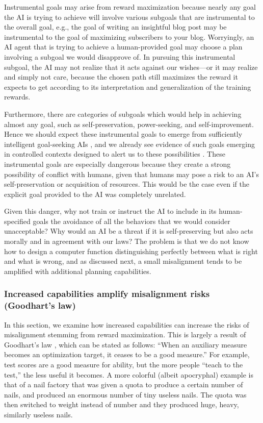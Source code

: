 Instrumental goals may arise from reward maximization because nearly any goal the AI is trying to achieve will involve various subgoals that are instrumental to the overall goal, e.g., the goal of writing an insightful blog post may be instrumental to the goal of maximizing subscribers to your blog. Worryingly, an AI agent that is trying to achieve a human-provided goal may choose a plan involving a subgoal we would disapprove of. In pursuing this instrumental subgoal, the AI may not realize that it acts against our wishes---or it may realize and simply not care, because the chosen path still maximizes the reward it expects to get according to its interpretation and generalization of the training rewards.

Furthermore, there are categories of subgoals which would help in achieving almost any goal, such as self-preservation, power-seeking, and self-improvement. Hence we should expect these instrumental goals to emerge from sufficiently intelligent goal-seeking AIs \cite{dl.acm.org.doi.10.5555.1566174.1566226}, and we already see evidence of such goals emerging in controlled contexts designed to alert us to these possibilities \cite{arxiv.org.abs.2412.04984}. These instrumental goals are especially dangerous because they create a strong possibility of conflict with humans, given that humans may pose a risk to an AI’s self-preservation or acquisition of resources. This would be the case even if the explicit goal provided to the AI was completely unrelated.

Given this danger, why not train or instruct the AI to include in its human-specified goals the avoidance of all the behaviors that we would consider unacceptable? Why would an AI be a threat if it is self-preserving but also acts morally and in agreement with our laws? The problem is that we do not know how to design a computer function distinguishing perfectly between what is right and what is wrong, and as discussed next, a small misalignment tends to be amplified with additional planning capabilities.

    \subsubsection{Increased capabilities amplify misalignment risks (Goodhart’s law)}
    \label{sec:existential:misagencyreward:capabilities}

In this section, we examine how increased capabilities can increase the risks of misalignment stemming from reward maximization. This is largely a result of Goodhart's law \cite{link.springer.com.chapter.10.1007.978.1.349.17295.5.4}, which can be stated as follows:
``When an auxiliary measure becomes an optimization target, it ceases to be a good measure.''
For example, test scores are a good measure for ability, but the more people ``teach to the test,'' the less useful it becomes. A more colorful (albeit apocryphal) example is that of a nail factory that was given a quota to produce a certain number of nails, and produced an enormous number of tiny useless nails. The quota was then switched to weight instead of number and they produced huge, heavy, similarly useless nails.

